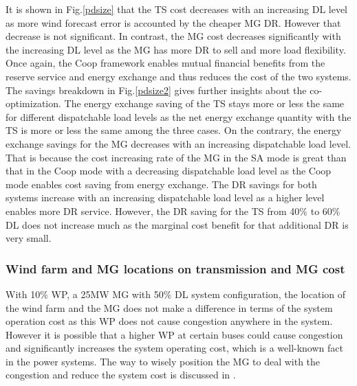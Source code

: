 It is shown in Fig.\ref{pdsize} that the TS cost decreases with an increasing DL level as more wind forecast error is accounted by the cheaper MG DR. However that decrease is not significant. In contrast, the MG cost decreases significantly with the increasing DL level as the MG has more DR to sell and more load flexibility. Once again, the Coop framework enables mutual financial benefits from the reserve service and energy exchange and thus reduces the cost of the two systems. The savings breakdown in Fig.\ref{pdsize2} gives further insights about the co-optimization. The energy exchange saving of the TS stays more or less the same for different dispatchable load levels as the net energy exchange quantity with the TS is more or less the same among the three cases. On the contrary, the energy exchange savings for the MG decreases with an increasing dispatchable load level. That is because the cost increasing rate of the MG in the SA mode is great than that in the Coop mode with a decreasing dispatchable load level as the Coop mode enables cost saving from energy exchange. The DR savings for both systems increase with an increasing dispatchable load level as a higher level enables more DR service. However, the DR saving for the TS from 40\% to 60\% DL does not increase much as the marginal cost benefit for that additional DR is very small.

\subsubsection{Wind farm and MG locations on transmission and MG cost}
With 10\% WP, a 25MW MG with 50\% DL system configuration, the location of the wind farm and the MG does not make a difference in terms of the system operation cost as this WP does not cause congestion anywhere in the system. However it is possible that a higher WP at certain buses could cause congestion and significantly increases the system operating cost, which is a well-known fact in the power systems. The way to wisely position the MG to deal with the congestion and reduce the system cost is discussed in \cite{liu2016quantifying}.
